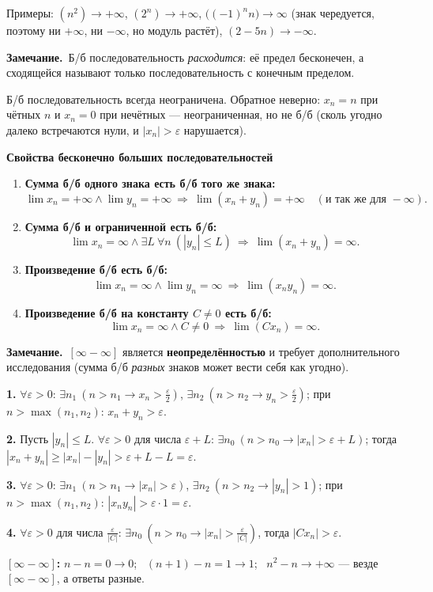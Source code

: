 \documentclass[a4paper,11pt]{article}
\newcommand{\eps}{\varepsilon}
\newcommand{\zam}{\par\smallskip\noindent\textbf{\textcolor{zamc}{Замечание.}}\ }
\newcommand{\podr}[1]{\par\needspace{8\baselineskip}\medskip
  {\large\bfseries\textcolor{oprc!80!black}{#1}}\par\nopagebreak\smallskip}
\begin{document}
Примеры: $(n^2) \to +\infty$, $(2^n) \to +\infty$, $\bigl((-1)^n n\bigr) \to \infty$ (знак чередуется,
поэтому ни $+\infty$, ни $-\infty$, но модуль растёт), $(2 - 5n) \to -\infty$.

\zam Б/б последовательность \emph{расходится}: её предел бесконечен, а сходящейся называют только последовательность
с конечным пределом.

\begin{dop}
Б/б последовательность всегда неограничена. Обратное неверно: $x_n = n$ при чётных $n$ и $x_n = 0$ при нечётных ---
неограниченная, но не б/б (сколь угодно далеко встречаются нули, и $|x_n| > \eps$ нарушается).
\end{dop}

\podr{Свойства бесконечно больших последовательностей}

\begin{enumerate}[leftmargin=*]
  \item \textbf{Сумма б/б одного знака есть б/б того же знака:}
    \[ \lim x_n = +\infty \wedge \lim y_n = +\infty \ \Longrightarrow\ \lim (x_n + y_n) = +\infty \quad (\text{и так же для } -\infty). \]
  \item \textbf{Сумма б/б и ограниченной есть б/б:}
    \[ \lim x_n = \infty \wedge \exists L\ \forall n\ (|y_n| \le L) \ \Longrightarrow\ \lim (x_n + y_n) = \infty. \]
  \item \textbf{Произведение б/б есть б/б:}
    \[ \lim x_n = \infty \wedge \lim y_n = \infty \ \Longrightarrow\ \lim (x_n y_n) = \infty. \]
  \item \textbf{Произведение б/б на константу $C \ne 0$ есть б/б:}
    \[ \lim x_n = \infty \wedge C \ne 0 \ \Longrightarrow\ \lim (C x_n) = \infty. \]
\end{enumerate}

\zam $[\infty - \infty]$ является \textbf{неопределённостью} и требует дополнительного исследования
(сумма б/б \emph{разных} знаков может вести себя как угодно).

\begin{dop}
\textbf{1.} $\forall \eps > 0$: $\exists n_1\ (n > n_1 \to x_n > \frac\eps2)$, $\exists n_2\ (n > n_2 \to y_n > \frac\eps2)$;
при $n > \max(n_1, n_2)$: $x_n + y_n > \eps$.

\textbf{2.} Пусть $|y_n| \le L$. $\forall \eps > 0$ для числа $\eps + L$: $\exists n_0\ (n > n_0 \to |x_n| > \eps + L)$; тогда
$|x_n + y_n| \ge |x_n| - |y_n| > \eps + L - L = \eps$.

\textbf{3.} $\forall \eps > 0$: $\exists n_1\ (n > n_1 \to |x_n| > \eps)$, $\exists n_2\ (n > n_2 \to |y_n| > 1)$;
при $n > \max(n_1, n_2)$: $|x_n y_n| > \eps \cdot 1 = \eps$.

\textbf{4.} $\forall \eps > 0$ для числа $\frac{\eps}{|C|}$: $\exists n_0\ (n > n_0 \to |x_n| > \frac{\eps}{|C|})$, тогда $|C x_n| > \eps$.

\textbf{$[\infty - \infty]$:} $n - n = 0 \to 0$; \ $(n + 1) - n = 1 \to 1$; \ $n^2 - n \to +\infty$ --- везде $[\infty - \infty]$, а ответы разные.
\end{dop}
\end{document}
